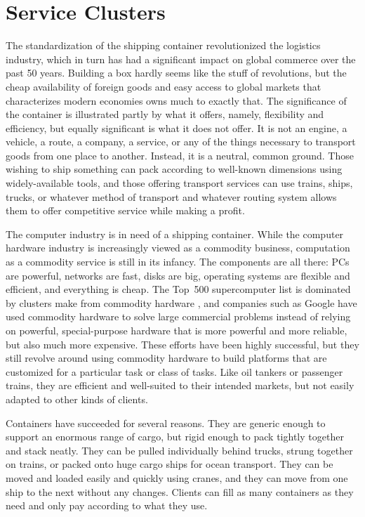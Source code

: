 \chapter{Service Clusters}\label{cha:motivation}

The standardization of the shipping container revolutionized the logistics industry, which in turn has had a significant impact on global commerce over the past 50 years. Building a box hardly seems like the stuff of revolutions, but the cheap availability of foreign goods and easy access to global markets that characterizes modern economies owns much to exactly that. The significance of the container is illustrated partly by what it offers, namely, flexibility and efficiency, but equally significant is what it does not offer. It is not an engine, a vehicle, a route, a company, a service, or any of the things necessary to transport goods from one place to another. Instead, it is a neutral, common ground. Those wishing to ship something can pack according to well-known dimensions using widely-available tools, and those offering transport services can use trains, ships, trucks, or whatever method of transport and whatever routing system allows them to offer competitive service while making a profit.

The computer industry is in need of a shipping container. While the computer hardware industry is increasingly viewed as a commodity business, computation as a commodity service is still in its infancy. The components are all there: PCs are powerful, networks are fast, disks are big, operating systems are flexible and efficient, and everything is cheap. The Top~500 supercomputer list is dominated by clusters make from commodity hardware \cite{top500}, and companies such as Google have used commodity hardware to solve large commercial problems instead of relying on powerful, special-purpose hardware that is more powerful and more reliable, but also much more expensive. These efforts have been highly successful, but they still revolve around using commodity hardware to build platforms that are customized for a particular task or class of tasks. Like oil tankers or passenger trains, they are efficient and well-suited to their intended markets, but not easily adapted to other kinds of clients.

Containers have succeeded for several reasons. They are generic enough to support an enormous range of cargo, but rigid enough to pack tightly together and stack neatly. They can be pulled individually behind trucks, strung together on trains, or packed onto huge cargo ships for ocean transport. They can be moved and loaded easily and quickly using cranes, and they can move from one ship to the next without any changes. Clients can fill as many containers as they need and only pay according to what they use.

